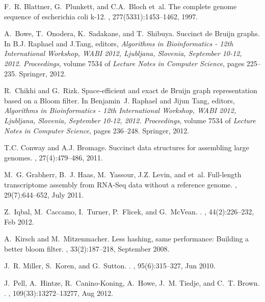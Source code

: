 \documentclass[pdftex]{llncs}\usepackage[T1]{fontenc}
\begin{document}
\begin{thebibliography}{10}

F.~R. Blattner, G.~Plunkett, and C.A.~Bloch et~al.
\newblock The complete genome sequence of escherichia coli k-12.
, 277(5331):1453--1462, 1997.

A.~Bowe, T.~Onodera, K.~Sadakane, and T.~Shibuya.
\newblock Succinct de {B}ruijn graphs.
\newblock In B.J. Raphael and J.Tang, editors, {\em Algorithms in
  Bioinformatics - 12th International Workshop, WABI 2012, Ljubljana, Slovenia,
  September 10-12, 2012. Proceedings}, volume 7534 of {\em Lecture Notes in
  Computer Science}, pages 225--235. Springer, 2012.

R.~Chikhi and G.~Rizk.
\newblock Space-efficient and exact de {B}ruijn graph representation based on a
  {B}loom filter.
\newblock In Benjamin~J. Raphael and Jijun Tang, editors, {\em Algorithms in
  Bioinformatics - 12th International Workshop, WABI 2012, Ljubljana, Slovenia,
  September 10-12, 2012. Proceedings}, volume 7534 of {\em Lecture Notes in
  Computer Science}, pages 236--248. Springer, 2012.

T.C. Conway and A.J. Bromage.
\newblock Succinct data structures for assembling large genomes.
, 27(4):479--486, 2011.

M.~G. Grabherr, B.~J. Haas, M.~Yassour, J.Z. Levin, and et~al.
\newblock Full-length transcriptome assembly from {RNA-Seq} data without a
  reference genome.
, 29(7):644--652, July 2011.

Z.~Iqbal, M.~Caccamo, I.~Turner, P.~Flicek, and G.~McVean.
.
, 44(2):226--232, Feb 2012.

A.~Kirsch and M.~Mitzenmacher.
\newblock Less hashing, same performance: Building a better bloom filter.
, 33(2):187--218, September 2008.

J.~R. Miller, S.~Koren, and G.~Sutton.
.
, 95(6):315--327, Jun 2010.

J.~Pell, A.~Hintze, R.~Canino-Koning, A.~Howe, J.~M. Tiedje, and C.~T. Brown.
.
, 109(33):13272--13277, Aug 2012.


\end{thebibliography}
\end{document}
